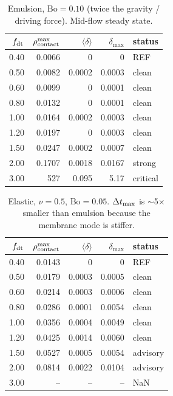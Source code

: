 \documentclass[aps,pre,twocolumn,floatfix,longbibliography]{revtex4-2}
\begin{document}
\begin{table}[h]
\caption{Emulsion, $\mathrm{Bo} = 0.10$ (twice the gravity / driving
  force).  Mid-flow steady state.}
\label{tab:dt_sweep_emul_010}
\begin{ruledtabular}
\begin{tabular}{rrrrl}
  $f_{\rm dt}$ & $\rho_{\rm contact}^{\max}$ & $\langle\delta\rangle$ &
  $\delta_{\max}$ & status \\
\hline
  0.40 & 0.0066 & 0      & 0      & REF \\
  0.50 & 0.0082 & 0.0002 & 0.0003 & clean \\
  0.60 & 0.0099 & 0      & 0.0001 & clean \\
  0.80 & 0.0132 & 0      & 0.0001 & clean \\
  1.00 & 0.0164 & 0.0002 & 0.0003 & clean \\
  1.20 & 0.0197 & 0      & 0.0003 & clean \\
  1.50 & 0.0247 & 0.0002 & 0.0007 & clean \\
  2.00 & 0.1707 & 0.0018 & 0.0167 & strong \\
  3.00 & 527    & 0.095  & 5.17   & critical \\
\end{tabular}
\end{ruledtabular}
\end{table}

\begin{table}[h]
\caption{Elastic, $\nu = 0.5$, $\mathrm{Bo} = 0.05$.  $\Delta t_{\rm max}$
  is $\sim$5$\times$ smaller than emulsion because the membrane mode is
  stiffer.}
\label{tab:dt_sweep_elastic}
\begin{ruledtabular}
\begin{tabular}{rrrrl}
  $f_{\rm dt}$ & $\rho_{\rm contact}^{\max}$ & $\langle\delta\rangle$ &
  $\delta_{\max}$ & status \\
\hline
  0.40 & 0.0143 & 0      & 0      & REF \\
  0.50 & 0.0179 & 0.0003 & 0.0005 & clean \\
  0.60 & 0.0214 & 0.0003 & 0.0006 & clean \\
  0.80 & 0.0286 & 0.0001 & 0.0054 & clean \\
  1.00 & 0.0356 & 0.0004 & 0.0049 & clean \\
  1.20 & 0.0425 & 0.0014 & 0.0060 & clean \\
  1.50 & 0.0527 & 0.0005 & 0.0054 & advisory \\
  2.00 & 0.0814 & 0.0022 & 0.0104 & advisory \\
  3.00 & --     & --     & --     & NaN \\
\end{tabular}
\end{ruledtabular}
\end{table}
\end{document}
